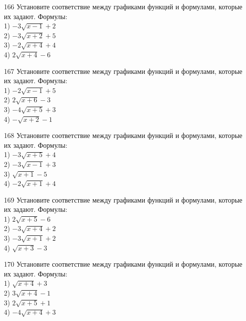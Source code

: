 \documentclass[4apaper]{article}
\begin{document}
\begin{taskBN}{166}
Установите соответствие между графиками функций и формулами, которые их задают. Формулы: \\1) $-3\sqrt{x-1}+2$\\2) $-3\sqrt{x+2}+5$\\3) $-2\sqrt{x+4}+4$\\4) $2\sqrt{x+4}-6$
\end{taskBN}

\begin{taskBN}{167}
Установите соответствие между графиками функций и формулами, которые их задают. Формулы: \\1) $-2\sqrt{x-1}+5$\\2) $2\sqrt{x+6}-3$\\3) $-4\sqrt{x+5}+3$\\4) $-\sqrt{x+2}-1$
\end{taskBN}

\begin{taskBN}{168}
Установите соответствие между графиками функций и формулами, которые их задают. Формулы: \\1) $-3\sqrt{x+5}+4$\\2) $-3\sqrt{x-1}+3$\\3) $\sqrt{x+1}-5$\\4) $-2\sqrt{x+1}+4$
\end{taskBN}

\begin{taskBN}{169}
Установите соответствие между графиками функций и формулами, которые их задают. Формулы: \\1) $2\sqrt{x+5}-6$\\2) $-3\sqrt{x+4}+2$\\3) $-3\sqrt{x+1}+2$\\4) $\sqrt{x+3}-3$
\end{taskBN}

\begin{taskBN}{170}
Установите соответствие между графиками функций и формулами, которые их задают. Формулы: \\1) $\sqrt{x+4}+3$\\2) $3\sqrt{x+4}-1$\\3) $2\sqrt{x+5}+1$\\4) $-4\sqrt{x+4}+3$
\end{taskBN}
\end{document}
